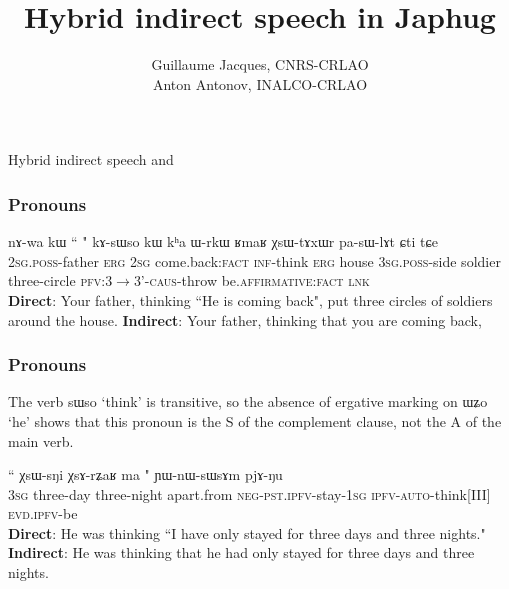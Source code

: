 \documentclass[xcolor=table]{beamer}
\newcommand{\rouge}[1]{{\color{red}#1}}
\newcommand{\bleu}[1]{{\color{blue}#1}}
\newcommand{\ipa}[1]{{\phon #1}} %
\begin{document}
 
\begin{frame} 

\title{Hybrid indirect speech in Japhug} 

 \author{Guillaume Jacques, CNRS-CRLAO \\ Anton Antonov, INALCO-CRLAO }
\maketitle
 \end{frame} 

 \begin{frame} 
Hybrid indirect speech \citealt{tournadre08conjunct} and \citealt{aikhenvald08semidirect}
 
   \begin{exe}
      \frametitle{Pronouns}
\ex \label{ex:nWGi.kAsWso}
\gll 
\ipa{nɤ-wa}  	\ipa{kɯ}  	``\rouge{\ipa{nɤʑo}} 	\bleu{\ipa{nɯɣi}}"  	\ipa{kɤ-sɯso}  	\ipa{kɯ}  	\ipa{kʰa}  	\ipa{ɯ-rkɯ}  	\ipa{ʁmaʁ}  	\ipa{χsɯ-tɤxɯr}  	\ipa{pa-sɯ-lɤt}  	\ipa{ɕti}  	\ipa{tɕe}  \\
\textsc{2sg.poss}-father \textsc{erg} \rouge{\textsc{2sg}} \bleu{come.back:\textsc{fact}}  \textsc{inf}-think \textsc{erg} house \textsc{3sg.poss}-side soldier three-circle \textsc{pfv:3$\rightarrow$3'-caus}-throw be.\textsc{affirmative}:\textsc{fact} \textsc{lnk}\\
\glt \textbf{Direct}: Your father, thinking ``\rouge{He} \bleu{is coming back}",   put three circles of soldiers around the house. 
\glt  \textbf{Indirect}: Your father, thinking that \rouge{you} are coming back,
 \end{exe}
  \end{frame} 
  
        \begin{frame} 
      \frametitle{Pronouns}
      The verb \ipa{sɯso} `think' is transitive, so the absence of ergative marking on \ipa{ɯʑo} `he' shows that this pronoun is the S of the complement clause, not the A of the main verb.
      
\begin{exe}
\ex
\gll  ``\rouge{\ipa{ɯʑo}}  	\ipa{χsɯ-sŋi}  	\ipa{χsɤ-rʑaʁ}  	\ipa{ma}  	\bleu{\ipa{mɯ-pɯ-rɤʑi-a}}"  	\ipa{ɲɯ-nɯ-sɯsɤm}  	\ipa{pjɤ-ŋu}  \\
\rouge{\textsc{3sg}} three-day  three-night apart.from \bleu{\textsc{neg-pst.ipfv}-stay-\textsc{1sg}} \textsc{ipfv-auto}-think[III] \textsc{evd.ipfv}-be \\
\glt    \textbf{Direct}: He was thinking ``\rouge{I} \bleu{have} only \bleu{stayed} for three days and three nights."
\glt    \textbf{Indirect}: He was thinking that \rouge{he} had only stayed for three days and three nights.
  \end{exe}
 \end{frame} 
 
\end{document}
